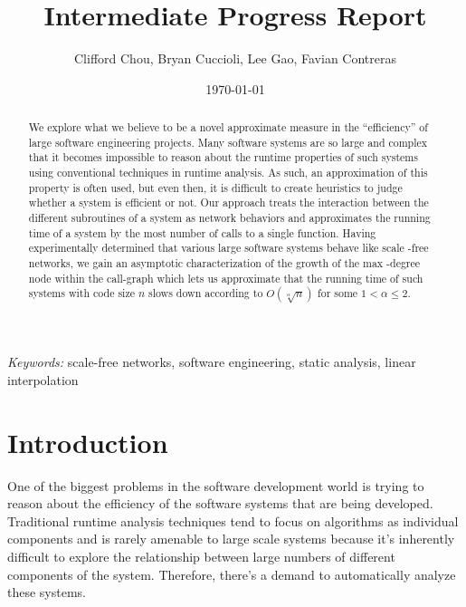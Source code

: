 \documentclass[11pt,a4paper]{article}
\author{Clifford Chou, Bryan Cuccioli, Lee Gao, 
Favian Contreras}
\date{\today}
\title{\textbf{Intermediate Progress Report}} %
\begin{document}


\renewcommand{\abstractname}{Abstract} %
\begin{singlespace}
\maketitle
\begin{abstract}
We explore what we believe to be a novel approximate measure in the 
``efficiency'' of large software engineering projects. Many software systems 
are so large and complex that it becomes impossible to reason about the 
runtime properties of such systems using conventional techniques in runtime 
analysis. As such, an approximation of this property is often used, but even 
then, it is difficult to create heuristics to judge whether a system is 
efficient or not. Our approach treats the interaction between the different 
subroutines of a system as network behaviors and approximates the running time 
of a system by the most number of calls to a single function. Having 
experimentally determined that various large software systems behave like scale
-free networks, we gain an asymptotic characterization of the growth of the max
-degree node within the call-graph which lets us approximate that the running 
time of such systems with code size $n$ slows down according to 
$O(\sqrt[\alpha]{n})$ for some $1 < \alpha \le 2$.
\end{abstract}

\hspace*{3,6mm}\textit{Keywords:} {\sf \small  scale-free networks, software 
engineering, static analysis, linear interpolation} %
\end{singlespace}
\vspace{10pt} %


\section*{Introduction}
One of the biggest problems in the software development world is trying to 
reason about the efficiency of the software systems that are being developed. 
Traditional runtime analysis techniques tend to focus on algorithms as 
individual components and is rarely amenable to large scale systems because 
it's inherently difficult to explore the relationship between large numbers of 
different components of the system. Therefore, there's a demand to 
automatically analyze these systems.
\end{document}
